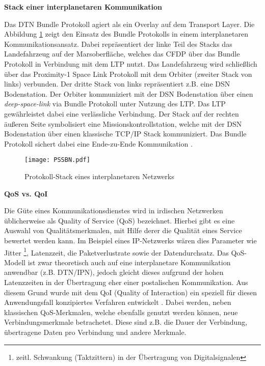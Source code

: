 \textbf{Stack einer interplanetaren Kommunikation}

Das \gls{DTN} Bundle Protokoll agiert als ein Overlay auf dem Transport Layer. Die
Abbildung \ref{fig:PSSBN} zeigt den Einsatz des Bundle Protokolls in einem
interplanetaren Kommunikationsansatz.
Dabei repr{\"a}sentiert der linke Teil des Stacks das Landefahrzeug auf der
Marsoberfl{\"a}che, welches das \gls{CFDP} {\"u}ber das Bundle Protokoll in
Verbindung mit dem \gls{LTP} nutzt.
Das Landefahrzeug wird schlie{\ss}lich {\"u}ber das Proximity-1 Space Link
Protokoll mit dem Orbiter (zweiter Stack von links) verbunden. Der dritte Stack
von links repr{\"a}sentiert z.B. eine \gls{DSN} Bodenstation. Der
Orbiter kommuniziert mit der \gls{DSN} Bodenstation {\"u}ber einen
\textit{deep-space-link} via Bundle Protokoll unter Nutzung des \gls{LTP}. Das
\gls{LTP} gew{\"a}hrleistet dabei eine verl{\"a}ssliche Verbindung. Der Stack
auf der rechten {\"a}u{\ss}eren Seite symbolisiert eine Missionskontrollstation,
welche mit der \gls{DSN} Bodenstation {\"u}ber einen klassische
\gls{TCP}/\gls{IP} Stack kommuniziert. Das Bundle Protokoll sichert dabei eine
Ende-zu-Ende Kommunikation \cite{DTNBundle}.

\begin{figure}[H]
\centering
\texttt{[image: PSSBN.pdf]}
\caption[Protokoll-Stack eines interplanetaren Netzwerks]
{Protokoll-Stack eines interplanetaren Netzwerks \cite{DTNBundle}}
\label{fig:PSSBN}
\end{figure}

\textbf{\gls{QoS} vs. \gls{QoI}}

Die G{\"u}te eines Kommunikationsdienstes wird in irdischen Netzwerken
{\"u}blicherweise als Quality of Service (QoS) bezeichnet. Hierbei gibt es eine
Auswahl von Qualit{\"a}tsmerkmalen, mit Hilfe derer die Qualit{\"a}t eines
Service bewertet werden kann. Im Beispiel eines IP-Netzwerks w{\"a}ren dies
Parameter wie Jitter \footnote{zeitl. Schwankung (Taktzittern) in der
{\"U}bertragung von Digitalsignalen}, Latenzzeit, die Paketverlustrate sowie der Datendurchsatz.
Das QoS-Modell ist zwar theoretisch auch auf eine interplanetare Kommunikation
anwendbar (z.B. DTN/IPN), jedoch gleicht dieses aufgrund der hohen Latenzzeiten
in der {\"U}bertragung eher einer postalischen Kommunikation. Aus diesem Grund
wurde mit dem QoI (Quality of Interaction) ein speziell f{\"u}r diesen
Anwendungsfall konzipiertes Verfahren entwickelt \cite{Daher2}. Dabei
werden, neben klassischen QoS-Merkmalen, welche ebenfalls genutzt werden
k{\"o}nnen, neue Verbindungsmerkmale betrachetet. Diese sind z.B. die
Dauer der Verbindung, {\"u}bertragene Daten pro Verbindung und andere Merkmale. 


